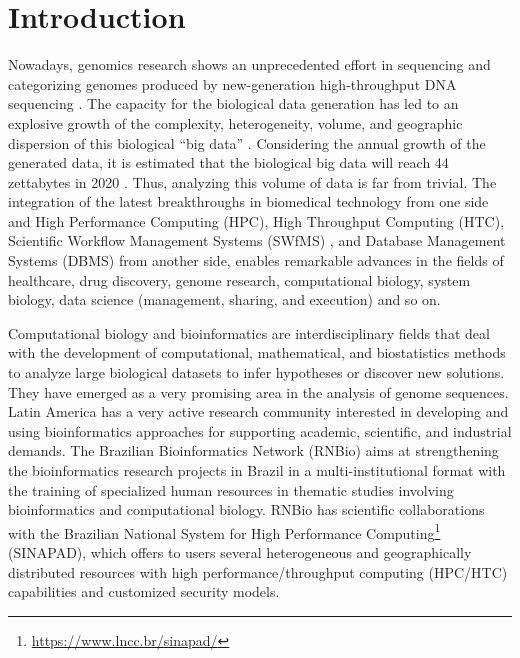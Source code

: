 \clearpage
\section{Introduction}
Nowadays, genomics research shows an unprecedented effort in sequencing and categorizing genomes produced by new-generation high-throughput DNA sequencing \cite{HEATHER20161}. The capacity for the biological data generation has led to an explosive growth of the complexity, heterogeneity, volume, and geographic dispersion of this biological “big data” \cite{10.1093/bib/bbx044}. Considering the annual growth of the generated data, it is estimated that the biological big data will reach 44 zettabytes in 2020 \cite{10.1093/bioinformatics/btx468}. Thus, analyzing this volume of data is far from trivial. The integration of the latest breakthroughs in biomedical technology from one side and High Performance Computing (HPC), High Throughput Computing (HTC), Scientific Workflow Management Systems (SWfMS) \cite{2002:WMM:509042}, and Database Management Systems (DBMS) \cite{Ramakrishnan:2003:DMS} from another side, enables remarkable advances in the fields of healthcare, drug discovery, genome research, computational biology, system biology, data science (management, sharing, and execution) and so on. 

Computational biology and bioinformatics are interdisciplinary fields that deal with the development of computational, mathematical, and biostatistics methods to analyze large biological datasets to infer hypotheses or discover new solutions. They have emerged as a very promising area in the analysis of genome sequences. Latin America has a very active research community interested in developing and using bioinformatics approaches for supporting academic, scientific, and industrial demands. The Brazilian Bioinformatics Network (RNBio) aims at strengthening the bioinformatics research projects in Brazil in a multi-institutional format with the training of specialized human resources in thematic studies involving bioinformatics and computational biology. RNBio has scientific collaborations with the Brazilian National System for High Performance Computing\footnote{\url{https://www.lncc.br/sinapad/}} (SINAPAD), which offers to users several heterogeneous and geographically distributed resources with high performance/throughput computing (HPC/HTC) capabilities and customized security models.

